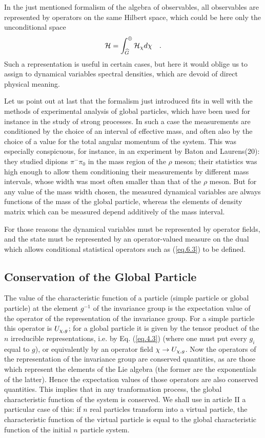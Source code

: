 \documentclass[a4paper,11pt]{article}
\begin{document}
In the just mentioned formalism of the algebra of observables, all observables are represented 
by operators on the same Hilbert space, which could be here only the unconditional space
\begin{equation}
 \label{eq.6.7}
    \mathcal{H} = \int_{\widehat{G}}^{\oplus} \mathcal{H}_{\chi} d\chi   \quad .
\end{equation}
Such a representation is useful in certain cases, but here it would oblige us to assign to 
dynamical variables spectral densities, which are devoid of direct physical meaning. 

Let us point out at last that the formalism just introduced fits in well with the methods of 
experimental analysis of global particles, which have been used for instance in the study of 
strong processes. In such a case the measurements are conditioned by the choice of an interval 
of effective mass, and often also by the choice of a value for the total angular momentum of 
the system. This was especially conspicuous, for instance, in an experiment by Baton and 
Laurens(20): they studied dipions $\pi^- \pi_0$ in the mass region of the $\rho$ meson; their 
statistics was 
high enough to allow them conditioning their measurements by different mass intervals, whose 
width was most often smaller than that of the $\rho$ meson. But for any value of the mass width 
chosen, the measured dynamical variables are always functions of the mass of the global 
particle, whereas the elements of density matrix which can be measured depend additively of the 
mass interval. 

For those reasons the dynamical variables must be represented by operator fields, and the state 
must be represented by an operator-valued measure on the dual which allows conditional 
statistical operators such as (\ref{eq.6.3}) to be defined.

\subsection{Conservation of the Global Particle}

The value of the characteristic function of a particle (simple particle or global particle) at 
the element $g^{-1}$ of the invariance group is the expectation value of the operator of the 
representation of the invariance group. For a simple particle this operator is $U_{\chi,g}$; for 
a 
global particle it is given by the tensor product of the $n$ irreducible representations, i.e. 
by 
Eq. (\ref{eq.4.3}) (where one must put every $g_i$ equal to $g$), or equivalently by an 
operator field $\chi \rightarrow U_{\chi,g}$. Now the operators of the representation of the 
invariance group are conserved 
quantities, as are those which represent the elements of the Lie algebra (the former are the 
exponentials of the latter). Hence the expectation values of those operators are also conserved 
quantities. This implies that in any tranformation process, the global characteristic function 
of the system is conserved. We shall use in article II a particular case of this: if $n$ real 
particles transform into a virtual particle, the characteristic function of the virtual 
particle is equal to the global characteristic function of the initial $n$ particle system. 
\end{document}
